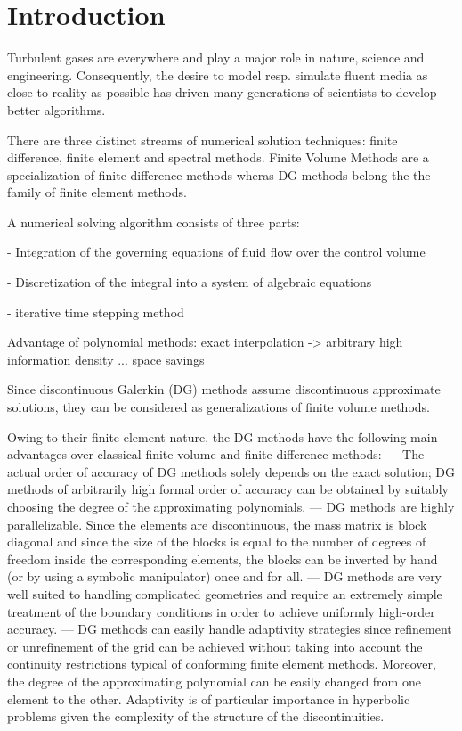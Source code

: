 \section{Introduction}

Turbulent gases are everywhere and play a major role in nature, science and
engineering. Consequently, the desire to model resp. simulate fluent media as
close to reality as possible has driven many generations of scientists to
develop better algorithms.


There are three distinct streams of numerical solution techniques: finite difference,
finite element and spectral methods. Finite Volume Methods are a specialization of
finite difference methods wheras DG methods belong the the family of finite element
methods.

A numerical solving algorithm consists of three parts:

- Integration of the governing equations of fluid flow over the control volume

- Discretization of the integral into a system of algebraic equations

- iterative time stepping method


Advantage of polynomial methods: exact interpolation -> arbitrary high information
density ... space savings

Since discontinuous Galerkin (DG) methods assume 
discontinuous approximate solutions, they can be considered as generalizations
of finite volume methods.

Owing to their finite element nature, the DG methods have the following
main advantages over classical finite volume and finite difference methods:
— The actual order of accuracy of DG methods solely depends on the 
exact solution; DG methods of arbitrarily high formal order of accuracy
can be obtained by suitably choosing the degree of the approximating
polynomials.
— DG methods are highly parallelizable. Since the elements are 
discontinuous, the mass matrix is block diagonal and since the size of the blocks
is equal to the number of degrees of freedom inside the corresponding
elements, the blocks can be inverted by hand (or by using a symbolic
manipulator) once and for all.
— DG methods are very well suited to handling complicated geometries
and require an extremely simple treatment of the boundary conditions in
order to achieve uniformly high-order accuracy.
— DG methods can easily handle adaptivity strategies since refinement or
unrefinement of the grid can be achieved without taking into account
the continuity restrictions typical of conforming finite element 
methods. Moreover, the degree of the approximating polynomial can be easily
changed from one element to the other. Adaptivity is of particular 
importance in hyperbolic problems given the complexity of the structure of
the discontinuities.

